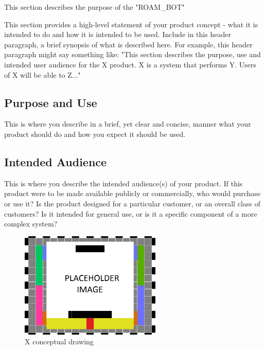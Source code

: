 This section describes the purpose of the "ROAM\_BOT"


This section provides a high-level statement of your product concept - what it is intended to do and how it is intended to be used. Include in this header paragraph, a brief synopsis of what is described here. For example, this header paragraph might say something like: "This section describes the purpose, use and intended user audience for the X product. X is a system that performs Y. Users of X will be able to Z..."

\subsection{Purpose and Use}
This is where you describe in a brief, yet clear and concise, manner what your product should do and how you expect it should be used.

\subsection{Intended Audience}
This is where you describe the intended audience(s) of your product. If this product were to be made available publicly or commercially, who would purchase or use it? Is the product designed for a particular customer, or an overall class of customers? Is it intended for general use, or is it a specific component of a more complex system?

\begin{figure}[h!]
	\centering
   	\includegraphics[width=0.60\textwidth]{images/test_image}
    \caption{X conceptual drawing} %
\end{figure}
